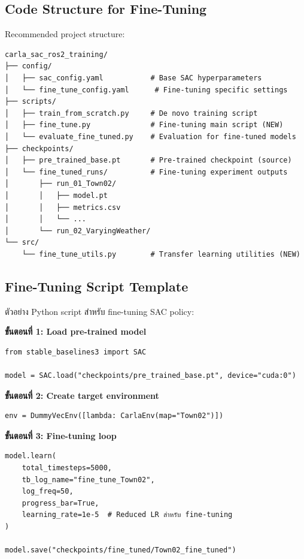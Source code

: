 \documentclass[10pt,a4paper,twocolumn]{article}
\begin{document}
\subsection{Code Structure for Fine-Tuning}

Recommended project structure:
\begin{verbatim}
carla_sac_ros2_training/
├── config/
│   ├── sac_config.yaml           # Base SAC hyperparameters
│   └── fine_tune_config.yaml      # Fine-tuning specific settings
├── scripts/
│   ├── train_from_scratch.py     # De novo training script
│   ├── fine_tune.py              # Fine-tuning main script (NEW)
│   └── evaluate_fine_tuned.py    # Evaluation for fine-tuned models
├── checkpoints/
│   ├── pre_trained_base.pt       # Pre-trained checkpoint (source)
│   └── fine_tuned_runs/          # Fine-tuning experiment outputs
│       ├── run_01_Town02/
│       │   ├── model.pt
│       │   ├── metrics.csv
│       │   └── ...
│       └── run_02_VaryingWeather/
└── src/
    └── fine_tune_utils.py        # Transfer learning utilities (NEW)
\end{verbatim}

\subsection{Fine-Tuning Script Template}

ตัวอย่าง Python script สำหรับ fine-tuning SAC policy:

\textbf{ขั้นตอนที่ 1: Load pre-trained model}
\begin{verbatim}
from stable_baselines3 import SAC

model = SAC.load("checkpoints/pre_trained_base.pt", device="cuda:0")
\end{verbatim}

\textbf{ขั้นตอนที่ 2: Create target environment}
\begin{verbatim}
env = DummyVecEnv([lambda: CarlaEnv(map="Town02")])
\end{verbatim}

\textbf{ขั้นตอนที่ 3: Fine-tuning loop}
\begin{verbatim}
model.learn(
    total_timesteps=5000,
    tb_log_name="fine_tune_Town02",
    log_freq=50,
    progress_bar=True,
    learning_rate=1e-5  # Reduced LR สำหรับ fine-tuning
)

model.save("checkpoints/fine_tuned/Town02_fine_tuned")
\end{verbatim}
\end{document}
